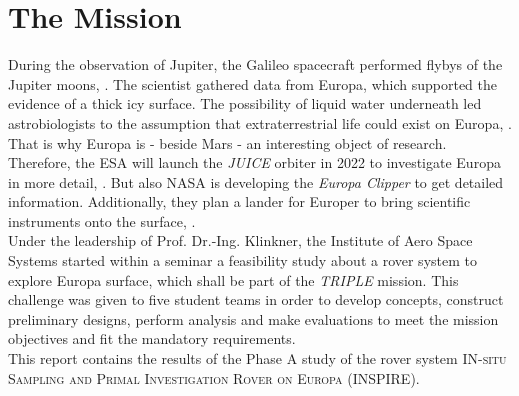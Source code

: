 %
%
%
\chapter{The Mission}
\label{chap:mission}

During the observation  of Jupiter, the Galileo spacecraft performed flybys of the Jupiter moons, \cite{Mission_01}.
The scientist gathered data from Europa, which supported the evidence of a thick icy surface.
The possibility of liquid water underneath led astrobiologists to the assumption that extraterrestrial life could exist on Europa, \cite{Mission_02}.
That is why Europa is - beside Mars - an interesting object of research.\\

Therefore, the ESA will launch the \textit{JUICE} orbiter in 2022 to investigate Europa in more detail, \cite{Mission_03}. 
But also NASA is developing the  \textit{Europa Clipper} to get detailed information.
Additionally, they plan a lander for Europer to bring scientific instruments onto the surface, \cite{Mission_04} \cite{Mission_05}.\\

Under the leadership of  Prof. Dr.-Ing. Klinkner, the Institute of Aero Space Systems started within a seminar a feasibility study about a rover system to explore Europa surface, which shall  be part of the \textit{TRIPLE} mission.
This challenge was given to five student teams in order to develop concepts, construct preliminary designs, perform analysis and make evaluations to  meet the mission objectives and fit the mandatory requirements. \\


This report contains the results of the Phase A study of the rover system \textsc{IN-situ Sampling and Primal Investigation Rover on Europa}  (INSPIRE).